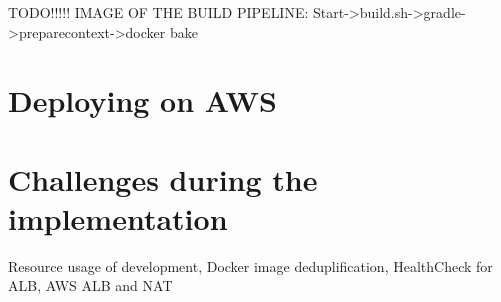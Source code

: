 		TODO!!!!! IMAGE OF THE BUILD PIPELINE: Start->build.sh->gradle->preparecontext->docker bake
		



	\section{Deploying on AWS}

	\section{Challenges during the implementation}
	Resource usage of development, Docker image deduplification, HealthCheck for ALB, AWS ALB and NAT